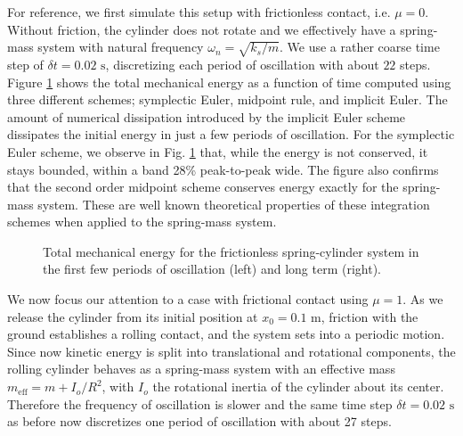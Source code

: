 For reference, we first simulate this setup with frictionless contact, i.e.
$\mu=0$. Without friction, the cylinder does not rotate and we effectively have a
spring-mass system with natural frequency $\omega_n=\sqrt{k_s/m}$. We use a
rather coarse time step of $\delta t=0.02\text{ s}$, discretizing each period of
oscillation with about $22$ steps. Figure
\ref{fig:frictionless_spring_cylinder_energy} shows the total mechanical energy
as a function of time computed using three different schemes; symplectic Euler,
midpoint rule, and implicit Euler. The amount of numerical dissipation
introduced by the implicit Euler scheme dissipates the initial energy in just a
few periods of oscillation. For the symplectic Euler scheme, we observe in Fig.
\ref{fig:frictionless_spring_cylinder_energy} that, while the energy is not
conserved, it stays bounded, within a band 28\% peak-to-peak wide. The figure
also confirms that the second order midpoint scheme conserves energy exactly for
the spring-mass system. These are well known theoretical properties of these
integration schemes when applied to the spring-mass system.
\begin{figure}[!h]
    \centering
    \caption{\label{fig:frictionless_spring_cylinder_energy} 
    Total mechanical energy for the frictionless spring-cylinder system in the
    first few periods of oscillation (left) and long term (right).}
\end{figure}

We now focus our attention to a case with frictional contact using $\mu=1$. As
we release the cylinder from its initial position at $x_0=0.1\text{ m}$,
friction with the ground establishes a rolling contact, and the system sets into
a periodic motion. Since now kinetic energy is split into translational and
rotational components, the rolling cylinder behaves as a spring-mass system with
an effective mass $m_\text{eff}=m+I_o/R^2$, with $I_o$ the rotational inertia of
the cylinder about its center. Therefore the frequency of oscillation is slower
and the same time step $\delta t=0.02\text{ s}$ as before now discretizes one
period of oscillation with about 27 steps.

